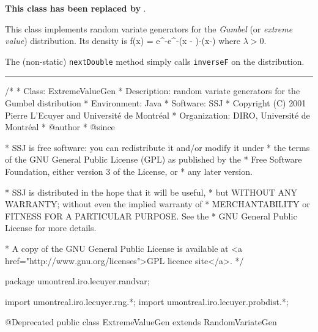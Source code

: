 
\textbf{This class has been replaced by }.

This class implements random variate generators for the \emph{Gumbel}
(or {\em extreme value\/}) distribution. Its density is
\eq
    f(x) = \lambda e^{-e^{-\lambda(x - \alpha)}-\lambda(x-\alpha)}
\endeq
where $\lambda>0$.

The (non-static) \texttt{nextDouble} method simply calls \texttt{inverseF} on the
distribution.

\bigskip\hrule

\begin{code}
\begin{hide}
/*
 * Class:        ExtremeValueGen
 * Description:  random variate generators for the Gumbel distribution
 * Environment:  Java
 * Software:     SSJ 
 * Copyright (C) 2001  Pierre L'Ecuyer and Université de Montréal
 * Organization: DIRO, Université de Montréal
 * @author       
 * @since

 * SSJ is free software: you can redistribute it and/or modify it under
 * the terms of the GNU General Public License (GPL) as published by the
 * Free Software Foundation, either version 3 of the License, or
 * any later version.

 * SSJ is distributed in the hope that it will be useful,
 * but WITHOUT ANY WARRANTY; without even the implied warranty of
 * MERCHANTABILITY or FITNESS FOR A PARTICULAR PURPOSE.  See the
 * GNU General Public License for more details.

 * A copy of the GNU General Public License is available at
   <a href="http://www.gnu.org/licenses">GPL licence site</a>.
 */
\end{hide}
package umontreal.iro.lecuyer.randvar;\begin{hide}
import umontreal.iro.lecuyer.rng.*;
import umontreal.iro.lecuyer.probdist.*;
\end{hide}

@Deprecated
public class ExtremeValueGen extends RandomVariateGen \begin{hide} {
   protected double alpha = -1.0;
   protected double lambda = -1.0;

\end{hide}
\end{code}

